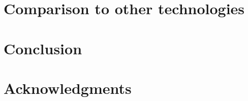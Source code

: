 \documentclass[preprint,12pt]{elsarticle}
\begin{document}
\section{Comparison to other technologies}
\label{ch:comparison}


\section{Conclusion}
\label{ch:conclusion}


\section{Acknowledgments}
\label{ch:acknowledgments}



\end{document}
